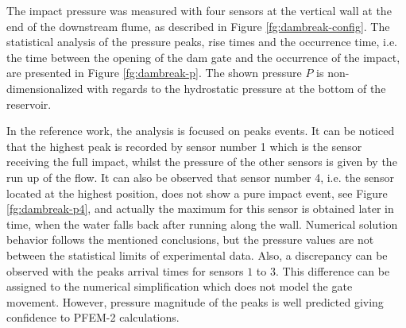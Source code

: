 \documentclass[a4paper,conference]{IEEEtran}
\begin{document}
The impact pressure was measured with four sensors at the vertical wall at the end of the downstream flume, as described in Figure \ref{fg:dambreak-config}. The statistical analysis of the pressure peaks, rise times and the occurrence time, i.e. the time between
the opening of the dam gate and the occurrence of the impact, are presented in Figure \ref{fg:dambreak-p}. The shown pressure $P$ is non-dimensionalized with regards to the hydrostatic pressure at the bottom of the reservoir.

In the reference work, the analysis is focused on peaks events. It can be noticed that the highest peak is recorded by sensor number 1 which is the sensor receiving the full impact, whilst the pressure of the other sensors is given by the run up of the flow. It can also be observed that sensor number 4, i.e. the sensor located at the highest position, does not show a pure impact event, see Figure \ref{fg:dambreak-p4}, and actually the maximum for this sensor is obtained later in time, when the water falls back after running along the wall. Numerical solution behavior follows the mentioned conclusions, but the pressure values are not between the statistical limits of experimental data. Also, a discrepancy can be observed with the peaks arrival times for sensors $1$ to $3$. This difference can be assigned to the numerical simplification which does not model the gate movement. However, pressure magnitude of the peaks is well predicted giving confidence to PFEM-2 calculations.
\end{document}
